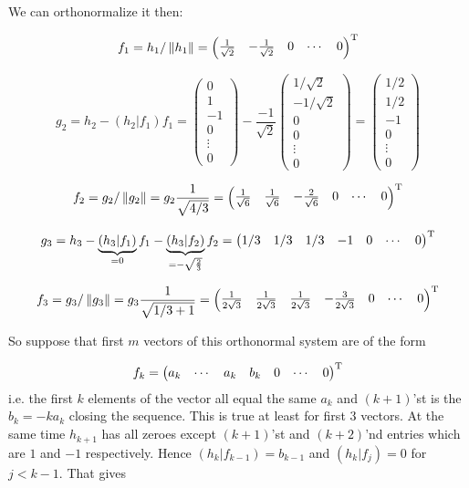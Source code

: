\documentclass{article}
\begin{document}
            We can orthonormalize it then:

$$f_1 = h_1 / \left\|{h_1}\right\| =
\begin{pmatrix}\frac{1}{\sqrt2} & - \frac{1}{\sqrt2} & 0 & \cdots & 0 \end{pmatrix}^{\mathrm{T}}$$

    $$g_2 = h_2 - \left(h_2|f_1\right)f_1 =
\begin{pmatrix}0\\ 1\\ -1 \\ 0 \\ \vdots \\ 0 \end{pmatrix}
    -
\frac{-1}{\sqrt2} \begin{pmatrix} 1/\sqrt2 \\ - 1/\sqrt2 \\ 0 \\ 0 \\ \vdots \\ 0 \end{pmatrix}
    = \begin{pmatrix} 1/2 \\ 1/2 \\ -1 \\ 0 \\ \vdots \\ 0 \end{pmatrix}$$

        $$f_2 = g_2/\left\|{g_2}\right\| =
g_2 \frac{1}{\sqrt{4/3}} =
\begin{pmatrix} \frac1{\sqrt6} & \frac1{\sqrt6} & - \frac2{\sqrt6} & 0 & \cdots & 0 \end{pmatrix}^{\mathrm{T}}$$

    $$g_3 =
h_3 - \underbrace{\left(h_3|f_1\right)}_{=0}f_1
    - \underbrace{\left(h_3|f_2\right)}_{=-\sqrt{\frac23}}f_2
= \begin{pmatrix} 1/3 & 1/3 & 1/3 & -1 & 0 & \cdots & 0 \end{pmatrix}^{\mathrm{T}}$$

    $$f_3 = g_3 / \left\|{g_3}\right\| = g_3 \frac{1}{\sqrt{1/3 + 1}} =
\begin{pmatrix}
    \frac{1}{2\sqrt3} & \frac{1}{2\sqrt3} &
    \frac{1}{2\sqrt3} & - \frac{3}{2\sqrt3} &
    0 & \cdots & 0
\end{pmatrix}^{\mathrm{T}}$$

So suppose that first $m$ vectors of this orthonormal system
are of the form

$$ f_k =
\begin{pmatrix}
    a_k & \cdots & a_k & b_k & 0 & \cdots & 0
\end{pmatrix}^{\mathrm{T}}$$
i.e. the first $k$ elements of the vector all equal the same $a_k$
and $(k+1)$'st is the $b_k = -ka_k$ closing the sequence.
This is true at least for first 3 vectors.
At the same time $h_{k+1}$ has all zeroes
except $(k+1)$'st and $(k+2)$'nd entries which are $1$ and $-1$ respectively.
Hence $\left(h_k|f_{k-1}\right) = b_{k-1}$ and $\left(h_k|f_j\right) = 0$ for $j < k-1$.
That gives
\end{document}
